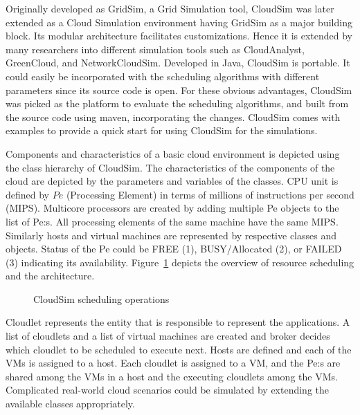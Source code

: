 \documentclass[times, 10pt,twocolumn]{article}
\begin{document}
Originally developed as GridSim, a Grid Simulation tool, CloudSim was later extended as a Cloud Simulation environment having GridSim as a major building block\cite{cloudgridsim}. Its modular architecture facilitates customizations. Hence it is extended by many researchers into different simulation tools such as CloudAnalyst\cite{cloudanalyst}, GreenCloud\cite{greencloud}, and NetworkCloudSim\cite{ncloudsim}. Developed in Java, CloudSim is portable. It could easily be incorporated with the scheduling algorithms with different parameters since its source code is open. For these obvious advantages, CloudSim was picked as the platform to evaluate the scheduling algorithms, and built from the source code using maven, incorporating the changes. CloudSim comes with examples to provide a quick start for using CloudSim for the simulations.

Components and characteristics of a basic cloud environment is depicted using the class hierarchy of CloudSim. The characteristics of the components of the cloud are depicted by the parameters and variables of the classes. CPU unit is defined by $Pe$ (Processing Element) in terms of millions of instructions per second (MIPS). Multicore processors are created by adding multiple Pe objects to the list of Pe:s. All processing elements of the same machine have the same MIPS. Similarly hosts and virtual machines are represented by respective classes and objects. Status of the Pe could be FREE (1), BUSY/Allocated (2), or FAILED (3) indicating its availability. Figure~\ref{fig:scheduling} depicts the overview of resource scheduling and the architecture.
\begin{figure}[ht]
 \caption{CloudSim scheduling operations}
 \label{fig:scheduling}
\end{figure}
Cloudlet represents the entity that is responsible to represent the applications. A list of cloudlets and a list of virtual machines are created and broker decides which cloudlet to be scheduled to execute next. Hosts are defined and each of the VMs is assigned to a host. Each cloudlet is assigned to a VM, and the Pe:s are shared among the VMs in a host and the executing cloudlets among the VMs. Complicated real-world cloud scenarios could be simulated by extending the available classes appropriately.
\end{document}
